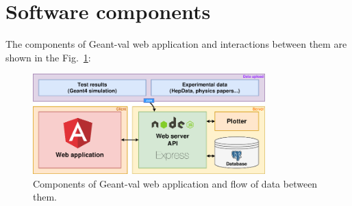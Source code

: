 \section{Software components}
\label{sec-webapplication}

The components of \textsf{Geant-val} web application and interactions between them are shown in the Fig.~\ref{fig:gvp_dataflow}:

\begin{figure}[h]
    \centering
    \includegraphics[width=0.8\textwidth,clip]{schema.png}
    \caption{Components of \textsf{Geant-val} web application and flow of data between them.}
    \label{fig:gvp_dataflow}
\end{figure}

